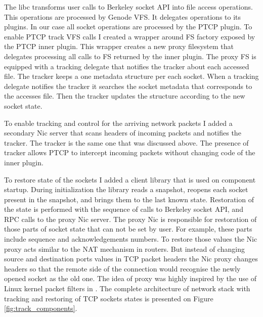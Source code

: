 The libc transforms user calls to Berkeley socket API into file access
operations. This operations are processed by Genode VFS. It delegates
operations to its plugins. In our case all socket operations are processed by
the PTCP plugin. To enable PTCP track VFS calls I created a wrapper around
FS factory exposed by the PTCP inner plugin. This wrapper creates a new
proxy filesystem that delegates processing all calls to FS returned by the
inner plugin. The proxy FS is equipped with a tracking delegate that notifies
the tracker about each accessed file. The tracker keeps a one metadata
structure per each socket. When a tracking delegate notifies the tracker it
searches the socket metadata that corresponds to the accesses file. Then the
tracker updates the structure according to the new socket state.

To enable tracking and control for the arriving network packets I added a
secondary Nic server that scans headers of incoming packets and notifies the
tracker. The tracker is the same one that was discussed above. The presence of
tracker allows PTCP to intercept incoming packets without changing code of the
inner plugin. 

To restore state of the sockets I added a client library that is used on
component startup. During initialization the library reads a snapshot, reopens
each socket present in the snapshot, and brings them to the last known state.
Restoration of the state is performed with the sequence of calls to Berkeley
socket API, and RPC calls to the proxy Nic server. The proxy Nic is responsible
for restoration of those parts of socket state that can not be set by user. For
example, these parts include sequence and acknowledgements numbers. To restore
those values the Nic proxy acts similar to the NAT mechanism in routers. But 
instead of changing source and destination ports values in TCP packet headers
the Nic proxy changes headers so that the remote side of the connection would
recognise the newly opened socket as the old one. The idea of proxy was highly
inspired by the use of Linux kernel packet filters in \cite{rocks_racks}. The
complete architecture of network stack with tracking and restoring of TCP
sockets states is presented on Figure \ref{fig:track_components}.

